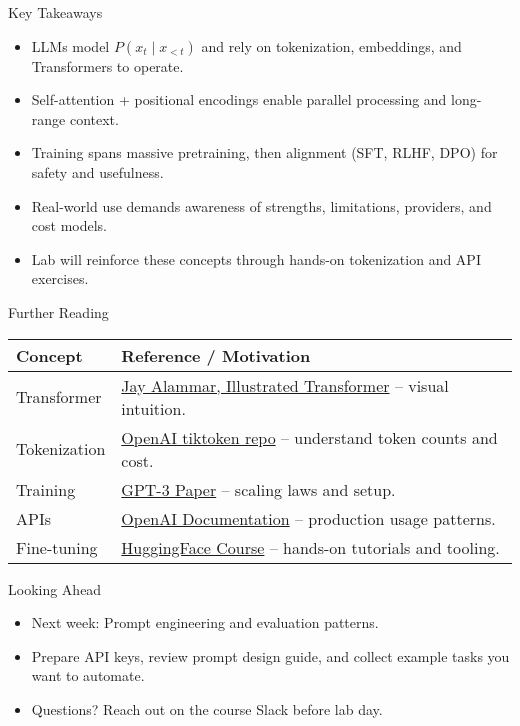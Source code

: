 \documentclass[aspectratio=169]{beamer}
\begin{document}
\begin{frame}{Key Takeaways}
  \begin{itemize}
    \item LLMs model $P(x_t \mid x_{<t})$ and rely on tokenization, embeddings, and Transformers to operate.
    \item Self-attention + positional encodings enable parallel processing and long-range context.
    \item Training spans massive pretraining, then alignment (SFT, RLHF, DPO) for safety and usefulness.
    \item Real-world use demands awareness of strengths, limitations, providers, and cost models.
    \item Lab will reinforce these concepts through hands-on tokenization and API exercises.
  \end{itemize}
\end{frame}

\begin{frame}{Further Reading}
  \begin{tabular}{@{}lp{6.8cm}@{}}
    Concept & Reference / Motivation \\
    \midrule
    Transformer & \href{https://jalammar.github.io/illustrated-transformer/}{Jay Alammar, Illustrated Transformer} -- visual intuition. \\
    Tokenization & \href{https://github.com/openai/tiktoken}{OpenAI tiktoken repo} -- understand token counts and cost. \\
    Training & \href{https://arxiv.org/abs/2005.14165}{GPT-3 Paper} -- scaling laws and setup. \\
    APIs & \href{https://platform.openai.com/docs}{OpenAI Documentation} -- production usage patterns. \\
    Fine-tuning & \href{https://huggingface.co/course}{HuggingFace Course} -- hands-on tutorials and tooling. \\
  \end{tabular}
\end{frame}

\begin{frame}{Looking Ahead}
  \begin{itemize}
    \item Next week: Prompt engineering and evaluation patterns.
    \item Prepare API keys, review prompt design guide, and collect example tasks you want to automate.
    \item Questions? Reach out on the course Slack before lab day.
  \end{itemize}
\end{frame}
\end{document}
